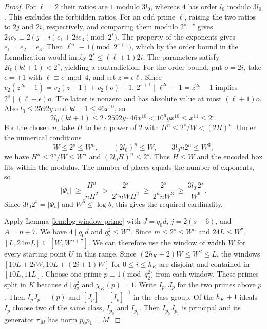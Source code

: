 \begin{proof}
For \(\ell=2\) their ratios are \(1\) modulo \(3l_0\), whereas \(4\) has
order \(l_0\) modulo \(3l_0\). This excludes the forbidden ratios.
For an odd prime \(\ell\), raising the two ratios to \(2j\) and \(2i\),
respectively, and comparing them modulo \(2^{s+v}\) gives
\(2j e_2\equiv2(j-i)e_1+2i e_3\pmod{2^s}\).
The property of the exponents gives \(e_1=e_2=e_3\).
Then \(\ell^{2i}\equiv1\pmod{2^{s+1}}\), which by the order bound in the
formalization would imply \(2^s\le(\ell+1)2i\).
The parameters satisfy \(2l_0(kt+1)<2^s\), yielding a contradiction.
For the order bound, put \(o=2i\), take \(\epsilon=\pm1\) with
\(\ell\equiv\epsilon\bmod4\), and set \(z=\epsilon\ell\).
Since \(v_2(z^{2o}-1)=v_2(z-1)+v_2(o)+1\),
\(2^{s+1}\mid\ell^{2o}-1=z^{2o}-1\) implies \(2^s\mid(\ell-\epsilon)o\).
The latter is nonzero and has absolute value at most \((\ell+1)o\).
Also \(l_0\le2592y\) and \(kt+1\le46x^{10}\), so
\[
 2l_0(kt+1)\le2\cdot2592y\cdot46x^{10}
   <10^6yx^{10}\le x^{11}\le2^s.
\]
For the chosen \(n\), take \(H\) to be a power of \(2\)
with \(H^n\le 2^s/W<(2H)^n\). Under the numerical conditions
\[
 W\le 2^s\le W^n,\qquad (2l_0)^n\le W,\qquad
 3l_0 n2^n\le W^3,
\]
we have \(H^n\le2^s/W\le W^n\) and \((2l_0H)^n\le2^s\).
Thus \(H\le W\) and the encoded box fits within the modulus. The number
of places equals the number of exponents, so
\[
 |\Phi_b|\ \ge\ \frac{H^n}{nH^2}\ >\
 \frac{2^s}{2^n n W H^2}\ \ge\
 \frac{2^s}{2^n n W^3}\ \ge\ \frac{3l_0\,2^s}{W^6}.
\]
Since \(3l_0 2^s=|\Phi_a|\) and \(W^6\le\log b\), this gives the required
cardinality.
\leanlinks{\leanref{Parameters.exists_isSparse}}

Apply Lemma \ref{lem:log-window-prime} with \(J=q_0d\), \(j=2(s+6)\),
and \(A=n+7\). We have \(4\mid q_0d\) and \(q_2^2\le W^n\).
Since \(m\le2^s\le W^n\) and \(24L\le W^7\),
\([L,24mL]\subseteq[W,W^{n+7}]\). We can therefore use the window of
width \(W\) for every starting point \(U\) in this range.
Since \((2h_K+2)W\le W^2\le L\), the windows
\([10L+2iW,10L+(2i+1)W]\) for \(0\le i\le h_K\) are disjoint and contained
in \([10L,11L]\). Choose one prime \(p\equiv1\pmod{q_2^2}\) from each window.
These primes split in \(K\) because \(d\mid q_2^2\) and \(\chi_K(p)=1\).
Write \(I_p,J_p\) for the two primes above \(p\).
Then \(I_pJ_p=(p)\) and \([J_p]=[I_p]^{-1}\) in the class group.
Of the \(h_K+1\) ideals \(I_p\) choose two of the same class, \(I_{p_0}\)
and \(I_{p_1}\). Then \(I_{p_0}J_{p_1}\) is principal and its generator
\(\overline{\pi_M}\) has norm \(p_0p_1=M\).


\end{proof}
